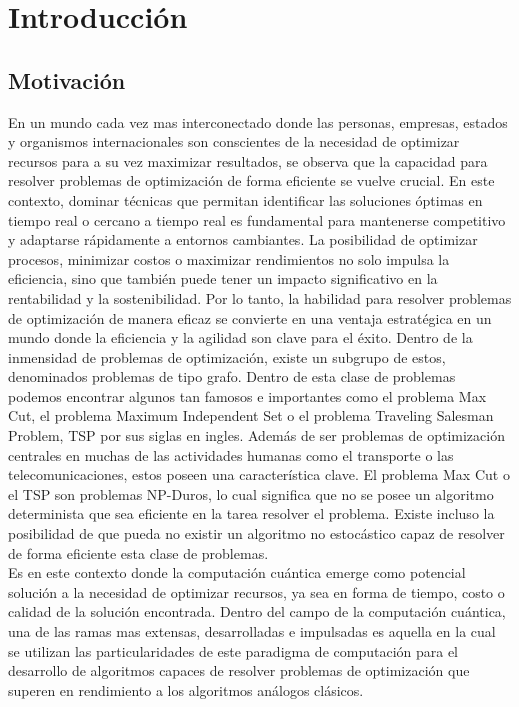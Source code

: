 \chapter{Introducción}

\section{Motivación}

En un mundo cada vez mas interconectado donde las personas, empresas, estados y organismos internacionales son conscientes de la necesidad de optimizar recursos para a su vez maximizar resultados, se observa que la capacidad para resolver problemas de optimización de forma eficiente se vuelve crucial. En este contexto, dominar técnicas que permitan identificar las soluciones óptimas en tiempo real o cercano a tiempo real es fundamental para mantenerse competitivo y adaptarse rápidamente a entornos cambiantes. La posibilidad de optimizar procesos, minimizar costos o maximizar rendimientos no solo impulsa la eficiencia, sino que también puede tener un impacto significativo en la rentabilidad y la sostenibilidad. Por lo tanto, la habilidad para resolver problemas de optimización de manera eficaz se convierte en una ventaja estratégica en un mundo donde la eficiencia y la agilidad son clave para el éxito. Dentro de la inmensidad de problemas de optimización, existe un subgrupo de estos, denominados problemas de tipo grafo. Dentro de esta clase de problemas podemos encontrar algunos tan famosos e importantes como el problema Max Cut, el problema Maximum Independent Set o el problema Traveling Salesman Problem, TSP por sus siglas en ingles. Además de ser problemas de optimización centrales en muchas de las actividades humanas como el transporte o las telecomunicaciones, estos poseen una característica clave. El problema Max Cut o el TSP son problemas NP-Duros, lo cual significa que no se posee un algoritmo determinista que sea eficiente en la tarea resolver el problema. Existe incluso la posibilidad de que pueda no existir un algoritmo no estocástico capaz de resolver de forma eficiente esta clase de problemas.\\

Es en este contexto donde la computación cuántica emerge como potencial solución a la necesidad de optimizar recursos, ya sea en forma de tiempo, costo o calidad de la solución encontrada. Dentro del campo de la computación cuántica, una de las ramas mas extensas, desarrolladas e impulsadas es aquella en la cual se utilizan las particularidades de este paradigma de computación para el desarrollo de algoritmos capaces de resolver problemas de optimización que superen en rendimiento a los algoritmos análogos clásicos. 

